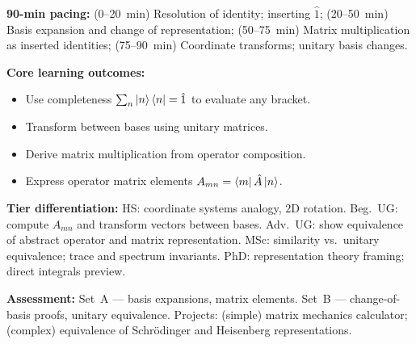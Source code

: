 \documentclass[11pt,a4paper]{article}
\begin{document}
\medskip
\begin{tcolorbox}[modulebox, title={Module~I.2 --- Lecture L05: Completeness, Change of Basis \& Matrix Mechanics}]
\textbf{90-min pacing:} (0--20~min) Resolution of identity; inserting $\hat{1}$;
(20--50~min) Basis expansion and change of representation;
(50--75~min) Matrix multiplication as inserted identities;
(75--90~min) Coordinate transforms; unitary basis changes.

\medskip\textbf{Core learning outcomes:}
\begin{itemize}[leftmargin=1.4em,topsep=2pt,itemsep=1pt]
  \item Use completeness $\sum_n\ket{n}\bra{n}=\hat{1}$ to evaluate any bracket.
  \item Transform between bases using unitary matrices.
  \item Derive matrix multiplication from operator composition.
  \item Express operator matrix elements $A_{mn}=\bra{m}\hat{A}\ket{n}$.
\end{itemize}

\medskip\textbf{Tier differentiation:}
HS: coordinate systems analogy, $2$D rotation.
Beg.\ UG: compute $A_{mn}$ and transform vectors between bases.
Adv.\ UG: show equivalence of abstract operator and matrix representation.
MSc: similarity vs.\ unitary equivalence; trace and spectrum invariants.
PhD: representation theory framing; direct integrals preview.

\medskip\textbf{Assessment:}
Set~A --- basis expansions, matrix elements.
Set~B --- change-of-basis proofs, unitary equivalence.
Projects: (simple) matrix mechanics calculator; (complex) equivalence of Schr\"odinger and Heisenberg representations.
\end{tcolorbox}
\end{document}
